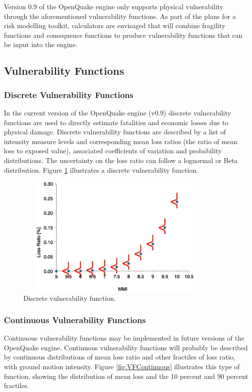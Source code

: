 Version 0.9 of the OpenQuake engine only supports physical vulnerability through the aforementioned \glspl{vulnerability function}. As part of the plans for a risk modelling toolkit, calculators are envisaged that will combine \glspl{fragility function} and \glspl{consequence function} to produce \glspl{vulnerability function} that can be input into the engine. 

\subsection{Vulnerability Functions}
\subsubsection{Discrete Vulnerability Functions}
In the current version of the OpenQuake engine (v0.9) discrete \glspl{vulnerability function} are used to directly estimate fatalities and economic losses due to physical damage. Discrete \glspl{vulnerability function} are described by a list of intensity measure levels and corresponding mean loss ratios (the ratio of mean loss to exposed value), associated coefficients of variation and probability distributions. The uncertainty on the loss ratio can follow a lognormal or Beta distribution. Figure \ref{fig:VFDiscrete} illustrates a discrete \gls{vulnerability function}.

\begin{figure}[ht]
\centering
\includegraphics[width=10cm,height=6cm]{./figures/risk/VFDiscrete.eps}
\caption{Discrete vulnerability function.}
\label{fig:VFDiscrete}
\end{figure}

\color{blue}
\subsubsection{Continuous Vulnerability Functions}
Continuous \glspl{vulnerability function} may be implemented in future versions of the OpenQuake engine. Continuous \glspl{vulnerability function} will probably be described by continuous distributions of mean loss ratio and other fractiles of loss ratio, with ground motion intensity. Figure \ref{fig:VFContinuous} illustrates this type of function, showing the distribution of mean loss and the 10 percent and 90 percent fractiles.

